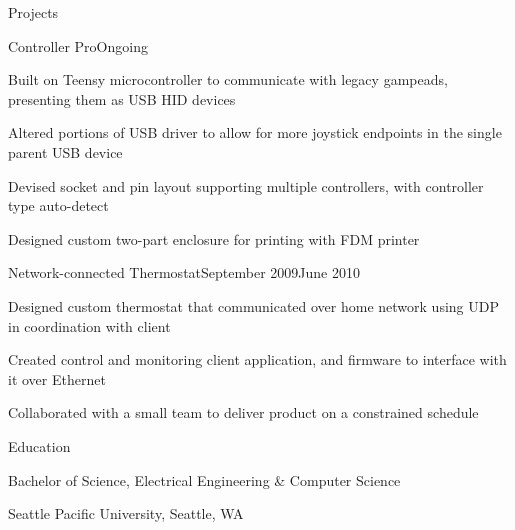 \documentclass[letterpaper,10pt]{article}
\begin{document}
\begin{res_section}{Projects}
    \begin{res_experienceitem}{Controller Pro}{}{}{Ongoing}{}
        \item Built on Teensy microcontroller to communicate with legacy gampeads, presenting them as USB HID devices
        \item Altered portions of USB driver to allow for more joystick endpoints in the single parent USB device
        \item Devised socket and pin layout supporting multiple controllers, with controller type auto-detect
        \item Designed custom two-part enclosure for printing with FDM printer
    \end{res_experienceitem}
    \begin{res_experienceitem}{Network-connected Thermostat}{}{}{September 2009}{June 2010}
        \item Designed custom thermostat that communicated over home network using UDP in coordination with client
        \item Created control and monitoring client application, and firmware to interface with it over Ethernet
        \item Collaborated with a small team to deliver product on a constrained schedule
    \end{res_experienceitem}
\end{res_section}

\begin{res_section}{Education}
\begin{res_subsection}{Bachelor of Science, Electrical Engineering \& Computer Science}
    \item Seattle Pacific University, Seattle, WA
\end{res_subsection}
\end{res_section}
\end{document}
